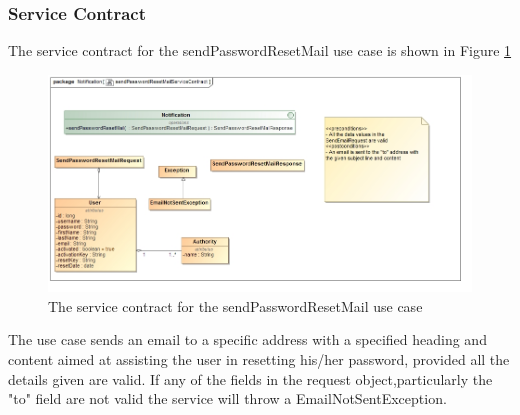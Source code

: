 \subsubsection{Service Contract}
The service contract for the sendPasswordResetMail use case is shown in Figure \ref{sendPasswordResetMailServiceContract}
\begin{figure}[H]
	\begin{center}
		\includegraphics[scale=0.5]{../Diagrams and Charts/Notifications/sendPasswordResetMailServiceContract.jpg}
		\caption{The service contract for the sendPasswordResetMail use case}
		\label{sendPasswordResetMailServiceContract}
	\end{center}
\end{figure}
	
The use case sends an email to a specific address with a specified heading and content
aimed at assisting the user in resetting his/her password, provided all the details
given are valid. If any of the fields in the request object,particularly the "to" field
are not valid the service will throw a EmailNotSentException.
